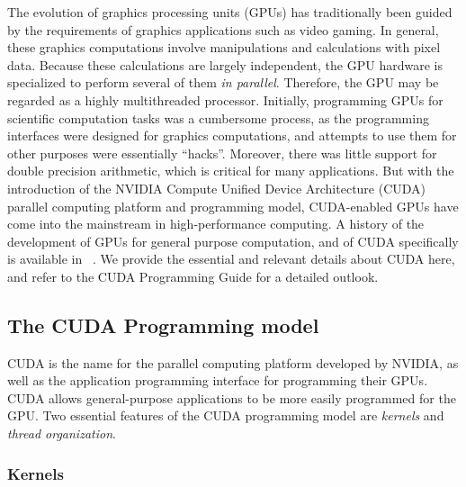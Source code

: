 The evolution of graphics processing units (GPUs)
has traditionally been guided by the requirements
of graphics applications such as video gaming.
In general, these graphics computations involve
manipulations and calculations with pixel data.
Because these calculations are largely independent,
the GPU hardware is specialized
to perform several of them \emph{in parallel}.
Therefore, the
GPU may be regarded as a highly multithreaded processor.
Initially,
programming GPUs for scientific computation tasks
was a cumbersome process,
as the programming interfaces were designed for graphics computations,
and attempts to use them for other purposes were essentially ``hacks''.
Moreover, there was little support for double precision arithmetic,
which is critical for many applications.
But with the introduction of the
NVIDIA Compute Unified Device Architecture (CUDA)
parallel computing platform
and programming model,
CUDA-enabled GPUs have come into the
mainstream in high-performance computing.
A history of the development of GPUs
for general purpose computation,
and of CUDA specifically is available
in ~\cite{HwuBook}.
We provide the essential and relevant details about CUDA here,
and refer to the
CUDA Programming Guide \cite{CUDAProgrammingGuide}
for a detailed outlook.

\subsection{The CUDA Programming model}

CUDA is the name for the parallel computing platform
developed by NVIDIA,
as well as the application programming interface
for programming their GPUs.
CUDA allows general-purpose applications to be
more easily programmed for the GPU.
Two essential features of the CUDA programming model
are \emph{kernels} and \emph{thread organization}.

\subsubsection{Kernels}

